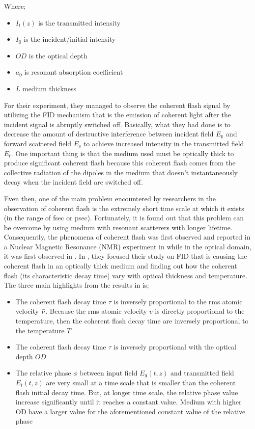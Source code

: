Where;

\begin{itemize}
    \item $I_{t}(z)$ is the transmitted intensity
    \item $I_{0}$ is the incident/initial intensity
    \item $OD$ is the optical depth
    \item $a_{0}$ is resonant absorption coefficient
    \item $L$ medium thickness
\end{itemize}

For their experiment, they managed to observe the coherent flash signal by utilizing the FID mechanism that is the emission of coherent light after the incident signal is abruptly switched off. Basically, what they had done is to decrease the amount of destructive interference between incident field $E_0$ and forward scattered field $E_s$ to achieve increased intensity in the transmitted field $E_t$. One important thing is that the medium used must be optically thick to produce significant coherent flash because this coherent flash comes from the collective radiation of the dipoles in the medium that doesn't instantaneously decay when the incident field are switched off.

Even then, one of the main problem encountered by researchers in the observation of coherent flash is the extremely short time scale at which it exists (in the range of fsec or psec). Fortunately, it is found out that this problem can be overcome by using medium with resonant scatterers with longer lifetime. Consequently, the phenomena of coherent flash was first observed and reported in a Nuclear Magnetic Resonance (NMR) experiment in \cite{Hahn1950} while in the optical domain, it was first observed in \cite{Brewer1972, Foster1974}. In \cite{Chalony2011}, they focused their study on FID that is causing the coherent flash in an optically thick medium and finding out how the coherent flash (its characteristic decay time) vary with optical thickness and temperature. The three main highlights from the results in \cite{Chalony2011} is;

\begin{itemize}
    \item The coherent flash decay time $\tau$ is inversely proportional to the rms atomic velocity $\Bar{\nu}$. Because the rms atomic velocity $\bar{v}$ is directly proportional to the temperature, then the coherent flash decay time are inversely proportional to the temperature $T$
    \item The coherent flash decay time $\tau$ is inversely proportional with the optical depth $OD$
    \item The relative phase $\phi$ between input field $E_{0}(t, z)$ and transmitted field $E_{t}(t, z)$ are very small at a time scale that is smaller than the coherent flash initial decay time. But, at longer time scale, the relative phase value increase significantly until it reaches a constant value. Medium with higher OD have a larger value for the aforementioned constant value of the relative phase
\end{itemize}

